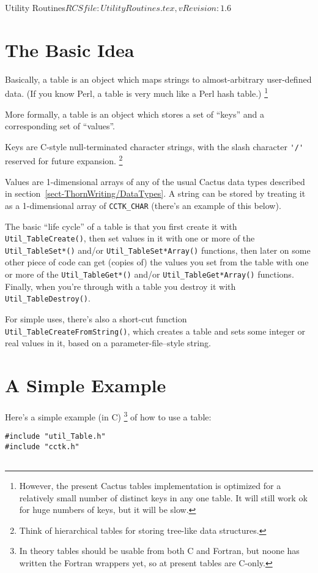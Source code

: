 \begin{cactuspart}{3}{Utility Routines}{$RCSfile: UtilityRoutines.tex,v $}{$Revision: 1.6 $}

\section{The Basic Idea}

Basically, a table is an object which maps strings to almost-arbitrary
user-defined data.  (If you know Perl, a table is very much like a
Perl hash table.)%
\footnote{%
	 However, the present Cactus tables implementation
	 is optimized for a relatively small number of
	 distinct keys in any one table.  It will still
	 work ok for huge numbers of keys, but it will be
	 slow.
	 }%

More formally, a table is an object which stores a set of ``keys''
and a corresponding set of ``values''.

Keys are C-style null-terminated character strings, with the slash
character \verb|'/'| reserved for future expansion.%
\footnote{%
	 Think of hierarchical tables for storing
	 tree-like data structures.%
	 }%

Values are 1-dimensional arrays of any of the usual Cactus data types
described in section~\ref{sect-ThornWriting/DataTypes}.
A string can be stored by treating it as a 1-dimensional array of
\verb|CCTK_CHAR| (there's an example of this below).

The basic ``life cycle'' of a table is that you first create it
with \verb|Util_TableCreate()|, then set values in it with one or
more of the \verb|Util_TableSet*()| and/or \verb|Util_TableSet*Array()|
functions, then later on some other piece of code can get (copies of)
the values you set from the table with one or more of the
\verb|Util_TableGet*()| and/or \verb|Util_TableGet*Array()| functions.
Finally, when you're through with a table you destroy it with
\verb|Util_TableDestroy()|.

For simple uses, there's also a short-cut function
\verb|Util_TableCreateFromString()|, which creates a table and
sets some integer or real values in it, based on a parameter-file--style
string.


\section{A Simple Example}

Here's a simple example (in C)%
\footnote{%
	 In theory tables should be usable from both
	 C and Fortran, but noone has written the Fortran
	 wrappers yet, so at present tables are C-only.
	 }%
{} of how to use a table:
\begin{verbatim}
#include "util_Table.h"
#include "cctk.h"


\end{verbatim}
\end{cactuspart}
